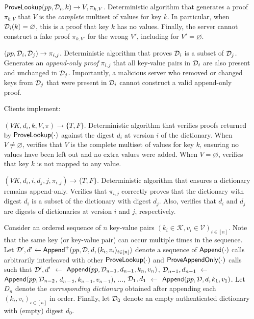 \api $\mathsf{ProveLookup}(pp, \mathcal{D}_i, k) \rightarrow V, \pi_{k,V}$.
Deterministic algorithm that generates a proof $\pi_{k,V}$ that $V$ is the \textit{complete} multiset of values for key $k$.
In particular, when $\mathcal{D}_i(k) = \varnothing$, this is a proof that key $k$ has no values.
Finally, the server cannot construct a fake proof $\pi_{k,V'}$ for the wrong $V'$, including for $V' = \varnothing$.

\api {\proveappendonly}$(pp, \mathcal{D}_i, \mathcal{D}_j) \rightarrow \pi_{i, j}$.
Deterministic algorithm that proves $\mathcal{D}_i$ is a subset of $\mathcal{D}_j$.
Generates an \textit{append-only proof} $\pi_{i, j}$ that all key-value pairs in $\mathcal{D}_i$ are also present and unchanged in $\mathcal{D}_j$.
Importantly, a malicious server who removed or changed keys from $\mathcal{D}_j$ that were present in $\mathcal{D}_i$ cannot construct a valid append-only proof.

Clients implement:
\vspace{.5em}

\api {\verlookup}$(VK, d_i, k, V, \pi) \rightarrow \{T, F\}$.
Deterministic algorithm that verifies proofs returned by $\mathsf{ProveLookup}(\cdot)$ against the digest $d_i$ at version $i$ of the dictionary.
When $V \ne \varnothing$, verifies that $V$ is the complete multiset of values for key $k$, ensuring no values have been left out and no extra values were added.
When $V = \varnothing$, verifies that key $k$ is not mapped to any value.

\api {\verappendonly}$(VK, d_i, i, d_j, j, \pi_{i,j}) \rightarrow \{T, F\}$.
Deterministic algorithm that ensures a dictionary remains append-only.
Verifies that $\pi_{i,j}$ correctly proves that the dictionary with digest $d_i$ is a subset of the dictionary with digest $d_j$.
Also, verifies that $d_i$ and $d_j$ are digests of dictionaries at version $i$ and $j$, respectively.

Consider an ordered sequence of $n$ key-value pairs $(k_i\in \mathcal{K}, v_i\in\mathcal{V})_{i\in [n]}$.
Note that the same key (or key-value pair) can occur multiple times in the sequence.
Let 
$\mathcal{D}',d' \leftarrow \mathsf{Append}^{+}(pp, \mathcal{D}, d, (k_i, v_i)_{i\in [n]})$ 
denote a sequence of $\mathsf{Append}(\cdot)$ calls arbitrarily interleaved with other $\mathsf{ProveLookup}(\cdot)$ and $\mathsf{ProveAppendOnly}(\cdot)$ calls such that 
$\mathcal{D}',d'$ $\leftarrow$ $\mathsf{Append}(pp,\mathcal{D}_{n-1}, d_{n-1}, k_{n}, v_n)$,
$\mathcal{D}_{n-1}, d_{n-1}$ $\leftarrow$ $\mathsf{Append}(pp,\mathcal{D}_{n-2}$, $d_{n-2}, k_{n-1}, v_{n-1})$,
$\dots$,
$\mathcal{D}_{1}, d_1$ $\leftarrow$ $\mathsf{Append}(pp,\mathcal{D}, d, k_{1}, v_{1})$.
Let $D_n$ denote the \textit{corresponding dictionary} obtained after appending each $(k_i, v_i)_{i\in [n]}$ in order.
Finally, let $\mathcal{D}_0$ denote an empty authenticated dictionary with (empty) digest $d_0$.

